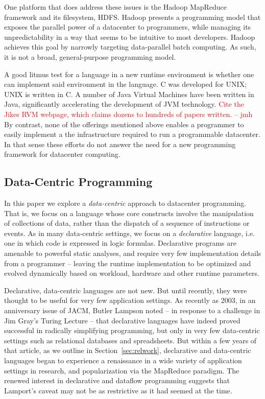 \documentclass{sig-alternate}
\newcommand{\jmh}[1]{{\textcolor{red}{#1 -- jmh}}}
\begin{document}
One platform that does address these issues is the Hadoop MapReduce framework and its filesystem, HDFS.  Hadoop presents a programming model that exposes  the parallel power of a datacenter to programmers, while managing its unpredictability in a way that seems to be intuitive to most developers.  Hadoop achieves this goal by narrowly targeting data-parallel batch computing.  As such, it is not a broad, general-purpose programming model.  

A good litmus test for a language in a new runtime environment is whether one can implement said environment in the language.  C was developed for UNIX; UNIX is written in C.  A number of Java Virtual Machines have been written in Java, significantly accelerating the development of JVM technology. \jmh{Cite the Jikes RVM webpage, which claims dozens to hundreds of papers written.}  By contrast, none of the offerings mentioned above enables a programmer to easily implement a the infrastructure required to run a programmable datacenter.  In that sense these efforts do not answer the need for a new programming framework for datacenter computing.

\subsection{Data-Centric Programming}
In this paper we explore a {\em data-centric} approach to datacenter programming.  That is, we focus on a language whose core constructs involve the manipulation of collections of data, rather than the dispatch of a sequence of instructions or events.  As in many data-centric settings, we focus on a {\em declarative} language, i.e. one in which code is expressed in logic formulas.  Declarative programs are amenable to powerful static analyses, and require very few implementation details from a programmer -- leaving the runtime implementation to be optimized and evolved dynamically based on workload, hardware and other runtime parameters.

Declarative, data-centric languages are not new.  But until recently, they were thought to be useful for very few application settings.  As recently as 2003, in an anniversary issue of JACM, Butler Lampson noted -- in response to a challenge in Jim Gray's Turing Lecture -- that declarative languages have indeed proved successful in radically simplifying programming, but only in very few data-centric settings such as relational databases and spreadsheets. But within a few years of that article, as we outline in Section~\ref{sec:relwork}, declarative and data-centric languages began to experience a renaissance in a wide variety of application settings in research, and popularization via the MapReduce paradigm. The renewed interest in declarative and dataflow programming suggests that Lamport's caveat may not be as restrictive as it had seemed at the time.
\end{document}
